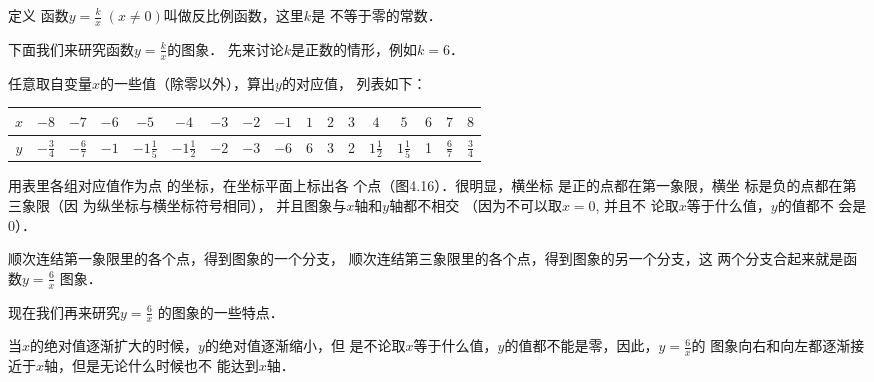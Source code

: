 \begin{blk}{定义}
函数$y=\frac{k}{x}\; (x\ne 0)$叫做反比例函数，这里$k$是
不等于零的常数．
\end{blk}

下面我们来研究函数$y=\frac{k}{x}$的图象．
先来讨论$k$是正数的情形，例如$k=6$．

任意取自变量$x$的一些值（除零以外），算出$y$的对应值，
列表如下：
\begin{center}
\begin{tabular}{c|cccccccccccccccc}
\hline
$x$ & $-8$   &    $-7$   &    $-6$   &    $-5$   &    $-4$   &    $-3$   &    $-2$   &    $-1$   &    $1$   &    $2$   &    $3$   &    $4$   &    $5$   &    $6$   &    $7$   &    $8$\\
\hline
$y$ &$-\frac{3}{4}$&$-\frac{6}{7}$&$-1$&$-1\frac{1}{5}$&$-1\frac{1}{2}$&$-2$&$-3$&$-6$&6&3&2&$1\frac{1}{2}$&$1\frac{1}{5}$&1&$\frac{6}{7}$&$\frac{3}{4}$\\
\hline
\end{tabular}
\end{center}

\begin{figure}[htp]
    \centering
{}
    \caption{}
\end{figure}

用表里各组对应值作为点
的坐标，在坐标平面上标出各
个点（图4.16）．很明显，横坐标
是正的点都在第一象限，横坐
标是负的点都在第三象限（因
为纵坐标与横坐标符号相同），
并且图象与$x$轴和$y$轴都不相交
（因为不可以取$x=0$, 并且不
论取$x$等于什么值，$y$的值都不
会是0）．



顺次连结第一象限里的各个点，得到图象的一个分支，
顺次连结第三象限里的各个点，得到图象的另一个分支，这
两个分支合起来就是函数$y=\frac{6}{x}$
图象．

现在我们再来研究$y=\frac{6}{x}$
的图象的一些特点．

当$x$的绝对值逐渐扩大的时候，$y$的绝对值逐渐缩小，但
是不论取$x$等于什么值，$y$的值都不能是零，因此，$y=\frac{6}{x}$的
图象向右和向左都逐渐接近于$x$轴，但是无论什么时候也不
能达到$x$轴．

